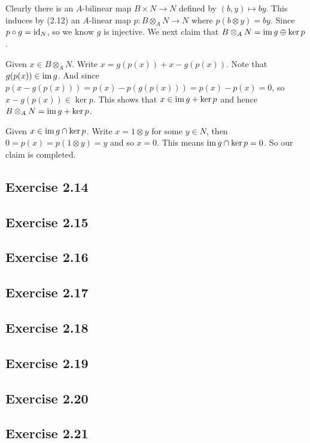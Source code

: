 \documentclass[../A&M.tex]{subfiles}
\begin{document}
Clearly there is an $A$-bilinear map $B \times N \to N$ defined by $(b,y)\mapsto by$. This induces by (2.12) an $A$-linear map $p: B \otimes_A N \to N$ where $p(b\otimes y) = by$. Since $p\circ g = \operatorname{id}_N$, so we know $g$ is injective. We next claim that $B \otimes_A N = \operatorname{im} g \oplus \ker p$.

Given $x\in B \otimes_A N$. Write $x = g(p(x)) + x - g(p(x))$. Note that $g(p(x)) \in \operatorname{im} g$. And since $p(x - g(p(x))) = p(x) - p(g(p(x))) = p(x) - p(x) = 0$, so $x - g(p(x)) \in \ker p$. This shows that $x \in \operatorname{im} g + \ker p$ and hence $B \otimes_A N = \operatorname{im} g + \ker p$.

Given $x \in \operatorname{im} g \cap \ker p$. Write $x = 1 \otimes y$ for some $y\in N$, then $0 = p(x) = p(1 \otimes y) = y$ and so $x = 0$. This means $\operatorname{im} g \cap \ker p = 0$. So our claim is completed.

\subsection*{Exercise 2.14}

\subsection*{Exercise 2.15}

\subsection*{Exercise 2.16}

\subsection*{Exercise 2.17}

\subsection*{Exercise 2.18}

\subsection*{Exercise 2.19}

\subsection*{Exercise 2.20}

\subsection*{Exercise 2.21}
\end{document}
